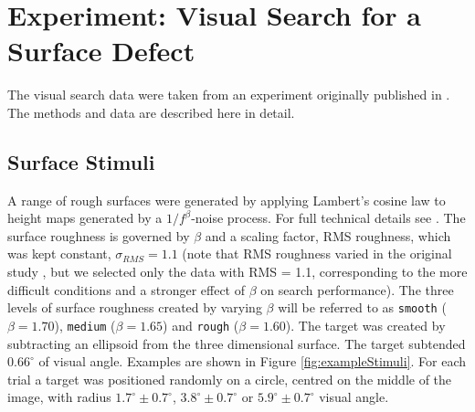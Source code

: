 \documentclass[preprint, authoryear]{elsarticle} %
\begin{document}
\section{Experiment: Visual Search for a Surface Defect}
\label{sec:surfacesearch}

The visual search data were taken from an experiment originally published in \citet{clarke2009}. The methods and data are described here in detail.

\subsection{Surface Stimuli}
A range of rough surfaces were generated by applying Lambert's cosine law to height maps generated by a $1/f^{\beta}$-noise process. For full technical details see \citet{clarke2008}. The surface roughness is governed by $\beta$ and a scaling factor, RMS roughness, which was kept constant, $\sigma_{RMS}=1.1$ (note that RMS roughness varied in the original study \citep{clarke2009}, but we selected only the data with RMS = 1.1, corresponding to the more difficult conditions and a stronger effect of $\beta$ on search performance). The three levels of surface roughness created by varying $\beta$ will be referred to as \texttt{smooth} ($\beta=1.70$), \texttt{medium} ($\beta=1.65$) and \texttt{rough} ($\beta=1.60$). The target was created by subtracting an ellipsoid from the three dimensional surface. The target subtended $0.66^{\circ}$ of visual angle. Examples are shown in Figure \ref{fig:exampleStimuli}. For each trial a target was positioned randomly on a circle, centred on the middle of the image, with radius $1.7^{\circ} \pm 0.7^{\circ}$, $3.8^{\circ} \pm 0.7^{\circ}$ or $5.9^{\circ} \pm 0.7^{\circ}$ visual angle. 
\end{document}
